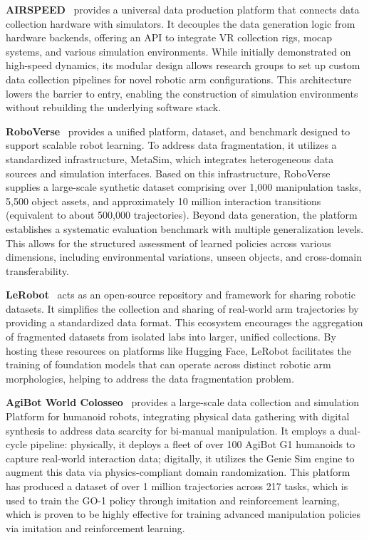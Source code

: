 \documentclass[acmsmall,screen,review,anonymous]{acmart}
\begin{document}
\textbf{AIRSPEED}~\cite{xia2024airspeed} provides a universal data production platform that connects data collection hardware with simulators. It decouples the data generation logic from hardware backends, offering an API to integrate VR collection rigs, mocap systems, and various simulation environments. While initially demonstrated on high-speed dynamics, its modular design allows research groups to set up custom data collection pipelines for novel robotic arm configurations. This architecture lowers the barrier to entry, enabling the construction of simulation environments without rebuilding the underlying software stack.

\textbf{RoboVerse}~\cite{roboverse2024} provides a unified platform, dataset, and benchmark designed to support scalable robot learning. To address data fragmentation, it utilizes a standardized infrastructure, MetaSim, which integrates heterogeneous data sources and simulation interfaces. Based on this infrastructure, RoboVerse supplies a large-scale synthetic dataset comprising over 1,000 manipulation tasks, 5,500 object assets, and approximately 10 million interaction transitions (equivalent to about 500,000 trajectories). Beyond data generation, the platform establishes a systematic evaluation benchmark with multiple generalization levels. This allows for the structured assessment of learned policies across various dimensions, including environmental variations, unseen objects, and cross-domain transferability.

\textbf{LeRobot}~\cite{lerobot2024} acts as an open-source repository and framework for sharing robotic datasets. It simplifies the collection and sharing of real-world arm trajectories by providing a standardized data format. This ecosystem encourages the aggregation of fragmented datasets from isolated labs into larger, unified collections. By hosting these resources on platforms like Hugging Face, LeRobot facilitates the training of foundation models that can operate across distinct robotic arm morphologies, helping to address the data fragmentation problem.

\textbf{AgiBot World Colosseo}~\cite{agibot2025} provides a large-scale data collection and simulation Platform for humanoid robots, integrating physical data gathering with digital synthesis to address data scarcity for bi-manual manipulation. It employs a dual-cycle pipeline: physically, it deploys a fleet of over 100 AgiBot G1 humanoids to capture real-world interaction data; digitally, it utilizes the Genie Sim engine to augment this data via physics-compliant domain randomization. This platform has produced a dataset of over 1 million trajectories across 217 tasks, which is used to train the GO-1 policy through imitation and reinforcement learning, which is proven to be highly effective for training advanced manipulation policies via imitation and reinforcement learning.
\end{document}
